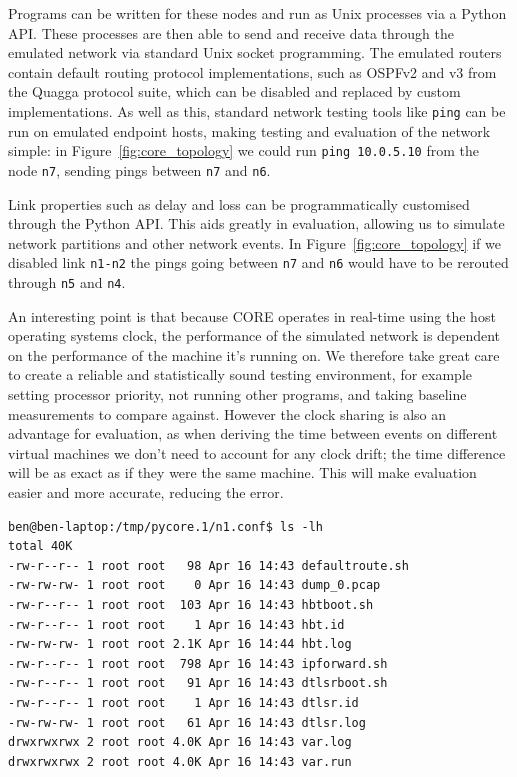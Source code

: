 \documentclass[withindex,glossary,openany]{cam-thesis}
\begin{document}
Programs can be written for these nodes and run as Unix processes via a Python API. These processes are then able to send and receive data through the emulated network via standard Unix socket programming. The emulated routers contain default routing protocol implementations, such as OSPFv2 and v3 from the Quagga protocol suite, which can be disabled and replaced by custom implementations. As well as this, standard network testing tools like \texttt{ping} can be run on emulated endpoint hosts, making testing and evaluation of the network simple: in Figure~\ref{fig:core_topology} we could run \texttt{ping 10.0.5.10} from the node \texttt{n7}, sending pings between \texttt{n7} and \texttt{n6}.

Link properties such as delay and loss can be programmatically customised through the Python API. This aids greatly in evaluation, allowing us to simulate network partitions and other network events. In Figure~\ref{fig:core_topology} if we disabled link \texttt{n1-n2} the pings going between \texttt{n7} and \texttt{n6} would have to be rerouted through \texttt{n5} and \texttt{n4}.

An interesting point is that because CORE operates in real-time using the host operating systems clock, the performance of the simulated network is dependent on the performance of the machine it's running on. We therefore take great care to create a reliable and statistically sound testing environment, for example setting processor priority, not running other programs, and taking baseline measurements to compare against. However the clock sharing is also an advantage for evaluation, as when deriving the time between events on different virtual machines we don't need to account for any clock drift; the time difference will be as exact as if they were the same machine. This will make evaluation easier and more accurate, reducing the error.

\begin{minipage}{1\textwidth} \centering
\begin{lstlisting}[label=core_filesystem, frame=tb, caption=Virtualised file-system of the node \texttt{n1}]
ben@ben-laptop:/tmp/pycore.1/n1.conf$ ls -lh
total 40K
-rw-r--r-- 1 root root   98 Apr 16 14:43 defaultroute.sh
-rw-rw-rw- 1 root root    0 Apr 16 14:43 dump_0.pcap
-rw-r--r-- 1 root root  103 Apr 16 14:43 hbtboot.sh
-rw-r--r-- 1 root root    1 Apr 16 14:43 hbt.id
-rw-rw-rw- 1 root root 2.1K Apr 16 14:44 hbt.log
-rw-r--r-- 1 root root  798 Apr 16 14:43 ipforward.sh
-rw-r--r-- 1 root root   91 Apr 16 14:43 dtlsrboot.sh
-rw-r--r-- 1 root root    1 Apr 16 14:43 dtlsr.id
-rw-rw-rw- 1 root root   61 Apr 16 14:43 dtlsr.log
drwxrwxrwx 2 root root 4.0K Apr 16 14:43 var.log
drwxrwxrwx 2 root root 4.0K Apr 16 14:43 var.run
\end{lstlisting}
\end{minipage}
\end{document}
